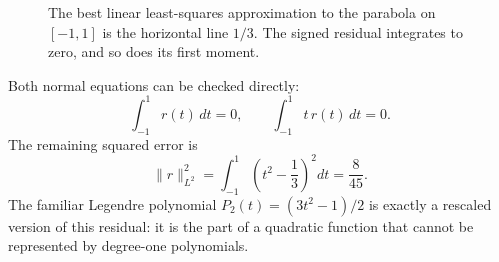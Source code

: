 \begin{figure}[H]
\centering
{}
\caption{The best linear least-squares approximation to the parabola on $[-1,1]$ is the horizontal line $1/3$. The signed residual integrates to zero, and so does its first moment.}
\end{figure}

Both normal equations can be checked directly:
\[
 \int_{-1}^1r(t)\,dt=0,\qquad
 \int_{-1}^1t\,r(t)\,dt=0.
\]
The remaining squared error is
\[
 \boxed{\|r\|_{L^2}^2
   =\int_{-1}^1\left(t^2-\frac13\right)^2dt
   =\frac8{45}.}
\]
The familiar Legendre polynomial $P_2(t)=(3t^2-1)/2$ is exactly a rescaled version of this residual: it is the part of a quadratic function that cannot be represented by degree-one polynomials.
